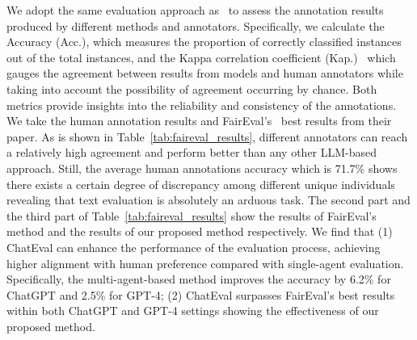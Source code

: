 We adopt the same evaluation approach as~\cite{wang2023large} to assess the annotation results produced by different methods and annotators. Specifically, we calculate the Accuracy (Acc.), which measures the proportion of correctly classified instances out of the total instances, and the Kappa correlation coefficient (Kap.)~\citep{mchugh2012interrater} which gauges the agreement between results from models and human annotators while taking into account the possibility of agreement occurring by chance. Both metrics provide insights into the reliability and consistency of the annotations. We take the human annotation results and FairEval's~\citep{wang2023large} best results from their paper. As is shown in Table~\ref{tab:faireval_results}, different annotators can reach a relatively high agreement and perform better than any other LLM-based approach. Still, the average human annotations accuracy which is 71.7\% shows there exists a certain degree of discrepancy among different unique individuals revealing that text evaluation is absolutely an arduous task. The second part and the third part of Table~\ref{tab:faireval_results} show the results of FairEval's method and the results of our proposed method respectively.
We find that (1) ChatEval can enhance the performance of the evaluation process, achieving higher alignment with human preference compared with single-agent evaluation. Specifically, the multi-agent-based method improves the accuracy by 6.2\% for ChatGPT and 2.5\% for GPT-4; (2) ChatEval surpasses FairEval's best results within both ChatGPT and GPT-4 settings showing the effectiveness of our proposed method.


